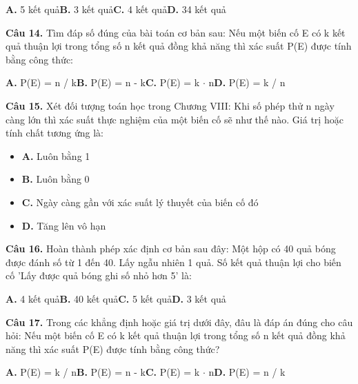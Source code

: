 \documentclass[11pt,a4paper]{article}
\begin{document}
\hspace*{1.5em}\textbf{A.} 5 kết quả\quad\quad \textbf{B.} 3 kết quả\quad\quad \textbf{C.} 4 kết quả\quad\quad \textbf{D.} 34 kết quả\par\vspace{2pt}
\textbf{\color{primary} Câu 14.} Tìm đáp số đúng của bài toán cơ bản sau: Nếu một biến cố E có k kết quả thuận lợi trong tổng số n kết quả đồng khả năng thì xác suất P(E) được tính bằng công thức:\par
\hspace*{1.5em}\textbf{A.} P(E) = n / k\quad\quad \textbf{B.} P(E) = n - k\quad\quad \textbf{C.} P(E) = k $\cdot$ n\quad\quad \textbf{D.} P(E) = k / n\par\vspace{2pt}
\textbf{\color{primary} Câu 15.} Xét đối tượng toán học trong Chương VIII: Khi số phép thử n ngày càng lớn thì xác suất thực nghiệm của một biến cố sẽ như thế nào. Giá trị hoặc tính chất tương ứng là:\par
\begin{itemize}\setlength{\itemsep}{1pt}\setlength{\parskip}{0pt}
  \item[] \textbf{A.} Luôn bằng 1
  \item[] \textbf{B.} Luôn bằng 0
  \item[] \textbf{C.} Ngày càng gần với xác suất lý thuyết của biến cố đó
  \item[] \textbf{D.} Tăng lên vô hạn
\end{itemize}\vspace{2pt}
\textbf{\color{primary} Câu 16.} Hoàn thành phép xác định cơ bản sau đây: Một hộp có 40 quả bóng được đánh số từ 1 đến 40. Lấy ngẫu nhiên 1 quả. Số kết quả thuận lợi cho biến cố 'Lấy được quả bóng ghi số nhỏ hơn 5' là:\par
\hspace*{1.5em}\textbf{A.} 4 kết quả\quad\quad \textbf{B.} 40 kết quả\quad\quad \textbf{C.} 5 kết quả\quad\quad \textbf{D.} 3 kết quả\par\vspace{2pt}
\textbf{\color{primary} Câu 17.} Trong các khẳng định hoặc giá trị dưới đây, đâu là đáp án đúng cho câu hỏi: Nếu một biến cố E có k kết quả thuận lợi trong tổng số n kết quả đồng khả năng thì xác suất P(E) được tính bằng công thức?\par
\hspace*{1.5em}\textbf{A.} P(E) = k / n\quad\quad \textbf{B.} P(E) = n - k\quad\quad \textbf{C.} P(E) = k $\cdot$ n\quad\quad \textbf{D.} P(E) = n / k\par\vspace{2pt}
\end{document}

